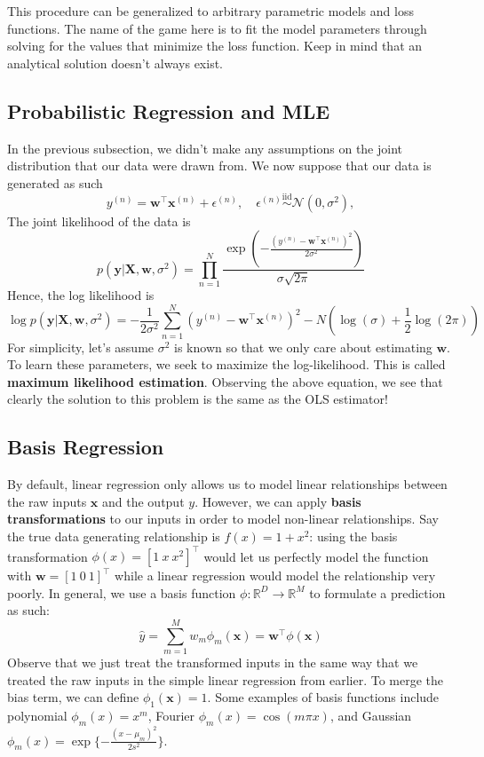 \documentclass[11pt, letterpaper]{article}
\theoremstyle{definition}
\theoremstyle{plain}
\begin{document}
This procedure can be generalized to arbitrary parametric models and loss functions. The name of the game here is to fit the model parameters through solving for the values that minimize the loss function. Keep in mind that an analytical solution doesn't always exist.

\subsection{Probabilistic Regression and MLE}
In the previous subsection, we didn't make any assumptions on the joint distribution that our data were drawn from. We now suppose that our data is generated as such
\[y^{(n)} = \bm{w}^\top\bm{x}^{(n)} + \epsilon^{(n)}, \quad \epsilon^{(n)} \overset{\mathrm{iid}}{\sim} \mathcal{N}(0, \sigma^2),\]
The joint likelihood of the data is
\[p(\bm y | \bm X, \bm w, \sigma^2) = \prod_{n=1}^{N}\frac{\exp\left(-\frac{(y^{(n)} - \bm{w}^\top\bm{x}^{(n)})^2}{2\sigma^2}\right)}{\sigma\sqrt{2\pi}}\]
Hence, the log likelihood is
\[\log p(\bm y | \bm X, \bm w, \sigma^2) = -\frac{1}{2\sigma^2}\sum_{n=1}^{N} (y^{(n)}- \bm{w}^\top\bm{x}^{(n)})^2 - N\left(\log(\sigma) + \frac{1}{2}\log(2\pi)\right) \]
For simplicity, let's assume $\sigma^2$ is known so that we only care about estimating $\bm w$. To learn these parameters, we seek to maximize the log-likelihood. This is called \textbf{maximum likelihood estimation}. Observing the above equation, we see that clearly the solution to this problem is the same as the OLS estimator!

 \subsection{Basis Regression}
By default, linear regression only allows us to model linear relationships between the raw inputs $\bm x$ and the output $y$. However, we can apply \textbf{basis transformations} to our inputs in order to model non-linear relationships. Say the true data generating relationship is $f(x)=1+ x^2$: using the basis transformation $\phi(x) = [1 \ x \ x^2]^\top $ would let us perfectly model the function with $\bm w = [1 \ 0 \ 1]^\top$ while a linear regression would model the relationship very poorly.  In general, we use a basis function $\phi : \mathbb{R}^D \to \mathbb{R}^M$ to formulate a prediction as such:
\[ \hat y = \sum_{m = 1}^{M}w_m \phi_m(\bm{x}) =\bm{w}^\top{\phi}(\bm{x})\]
Observe that we just treat the transformed inputs in the same way that we treated the raw inputs in the simple linear regression from earlier. To merge the bias term, we can define $\phi_1(\bm{x})=1$. Some examples of basis functions include polynomial $\phi_m(x) = x^m$, Fourier $\phi_m(x) = \cos( m \pi x )$, and Gaussian $\phi_m(x) = \exp \{- \frac{(x - \mu_m)^2}{2s^2}\}$. 
\end{document}
